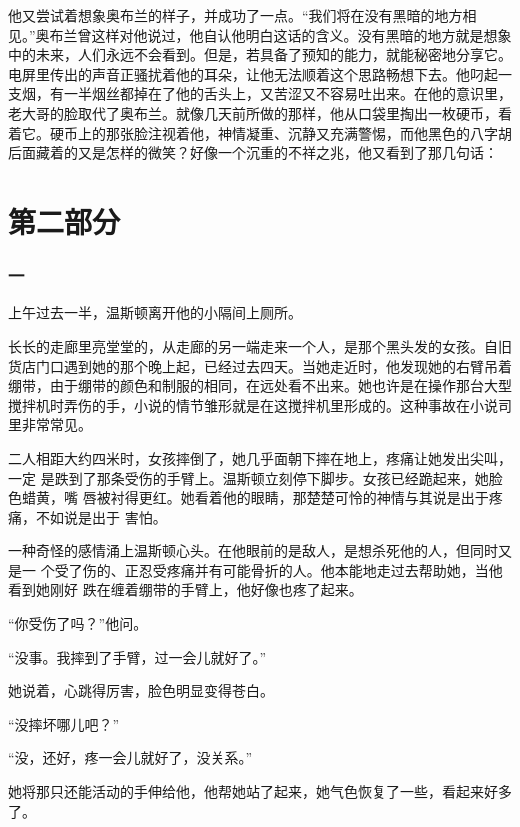他又尝试着想象奥布兰的样子，并成功了一点。``我们将在没有黑暗的地方相见。''奥布兰曾这样对他说过，他自认他明白这话的含义。没有黑暗的地方就是想象中的未来，人们永远不会看到。但是，若具备了预知的能力，就能秘密地分享它。电屏里传出的声音正骚扰着他的耳朵，让他无法顺着这个思路畅想下去。他叼起一支烟，有一半烟丝都掉在了他的舌头上，又苦涩又不容易吐出来。在他的意识里，老大哥的脸取代了奥布兰。就像几天前所做的那样，他从口袋里掏出一枚硬币，看着它。硬币上的那张脸注视着他，神情凝重、沉静又充满警惕，而他黑色的八字胡后面藏着的又是怎样的微笑？好像一个沉重的不祥之兆，他又看到了那几句话：


\part*{第二部分}

\section*{一}\label{ux4e5d}

上午过去一半，温斯顿离开他的小隔间上厕所。

长长的走廊里亮堂堂的，从走廊的另一端走来一个人，是那个黑头发的女孩。自旧货店门口遇到她的那个晚上起，已经过去四天。当她走近时，他发现她的右臂吊着绷带，由于绷带的颜色和制服的相同，在远处看不出来。她也许是在操作那台大型搅拌机时弄伤的手，小说的情节雏形就是在这搅拌机里形成的。这种事故在小说司里非常常见。

二人相距大约四米时，女孩摔倒了，她几乎面朝下摔在地上，疼痛让她发出尖叫，一定
是跌到了那条受伤的手臂上。温斯顿立刻停下脚步。女孩已经跪起来，她脸色蜡黄，嘴
唇被衬得更红。她看着他的眼睛，那楚楚可怜的神情与其说是出于疼痛，不如说是出于
害怕。

一种奇怪的感情涌上温斯顿心头。在他眼前的是敌人，是想杀死他的人，但同时又是一
个受了伤的、正忍受疼痛并有可能骨折的人。他本能地走过去帮助她，当他看到她刚好
跌在缠着绷带的手臂上，他好像也疼了起来。

``你受伤了吗？''他问。

``没事。我摔到了手臂，过一会儿就好了。''

她说着，心跳得厉害，脸色明显变得苍白。

``没摔坏哪儿吧？''

``没，还好，疼一会儿就好了，没关系。''

她将那只还能活动的手伸给他，他帮她站了起来，她气色恢复了一些，看起来好多了。

